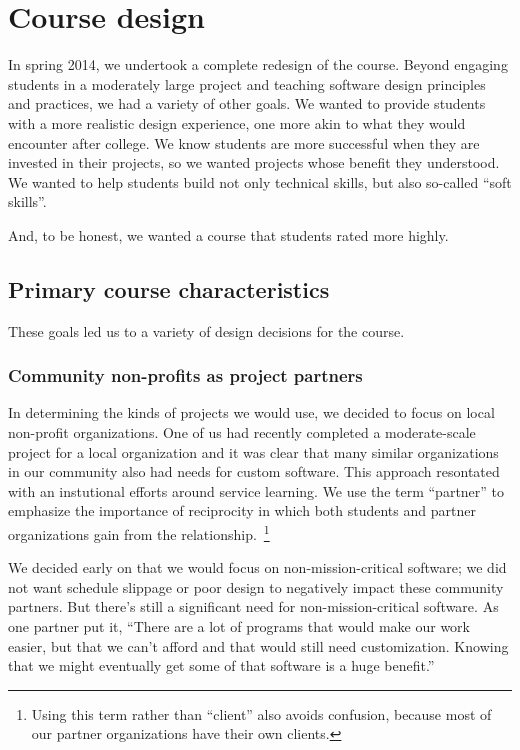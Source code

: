 \section{Course design}


In spring 2014, we undertook a complete redesign of the course.  
Beyond engaging students in a moderately large project and teaching 
software design principles and practices, 
we had a variety of other goals. 
We wanted
to provide students with a more realistic design experience, one more
akin to what they would encounter after college.  We know students
are more successful when they are invested in their projects, so we
wanted projects whose benefit they understood.  We wanted to help
students build not only technical skills, but also so-called ``soft
skills''.  

And, to be honest, we wanted a course that students rated more highly.

\subsection{Primary course characteristics}

These goals led us to a variety of design decisions for the course.

\subsubsection{Community non-profits as project partners}

In determining the kinds of projects we would use, we decided to
focus on local non-profit organizations.  One of us had recently
completed a moderate-scale project for a local organization and it
was clear that many similar organizations in our community also had
needs for custom software.  This approach resontated with an 
instutional efforts around service learning.
We use the term ``partner'' to emphasize the importance of
reciprocity in which both students and partner organizations gain from 
the relationship.~\footnote{Using this term rather than ``client'' 
also avoids confusion, because most of our partner organizations have their own 
clients.}

We decided early on that we would focus
on non-mission-critical software; we did not want schedule slippage
or poor design to negatively impact these community partners.
But there's still a significant need for non-mission-critical software.
As one partner
put it, ``There are a lot of programs that would make
our work easier, but that we can't afford and that would still need
customization.  Knowing that we might eventually get some of that
software is a huge benefit.''  

